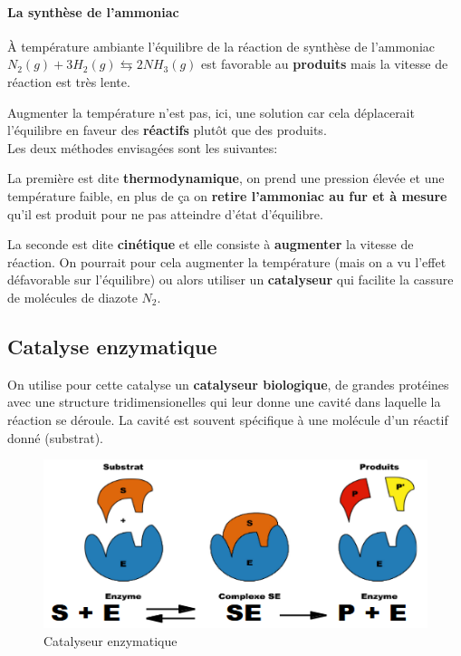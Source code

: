 \documentclass[10pt,a4paper]{book}
\begin{document}
\paragraph{La synthèse de l'ammoniac} À température ambiante l'équilibre de la réaction de synthèse de l'ammoniac \(N_2(g) + 3H_2(g) \leftrightarrows 2NH_3(g)\) est favorable au \textbf{produits} mais la vitesse de réaction est très lente. \par
Augmenter la température n'est pas, ici, une solution car cela déplacerait l'équilibre en faveur des \textbf{réactifs} plutôt que des produits. \\
Les deux méthodes envisagées sont les suivantes: \par
La première est dite \textbf{thermodynamique}, on prend une pression élevée et une température faible, en plus de ça on \textbf{retire l'ammoniac au fur et à mesure} qu'il est produit pour ne pas atteindre d'état d'équilibre. \par
La seconde est dite \textbf{cinétique} et elle consiste à \textbf{augmenter} la vitesse de réaction. On pourrait pour cela augmenter la température (mais on a vu l'effet défavorable sur l'équilibre) ou alors utiliser un \textbf{catalyseur} qui facilite la cassure de molécules de diazote $N_2$. \\

\subsection{Catalyse enzymatique} %
\par
On utilise pour cette catalyse un \textbf{catalyseur biologique}, de grandes protéines avec une structure tridimensionelles qui leur donne une cavité dans
laquelle la réaction se déroule. La cavité est souvent spécifique à une molécule d'un réactif donné (substrat).
\begin{figure}[h!]
\begin{center}
\includegraphics[scale=0.75]{./assets/enzyme_cata.png}
\end{center}
\caption{Catalyseur enzymatique}
\label{fig:enzymes}
\end{figure}
\end{document}
